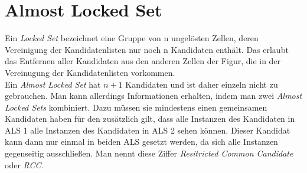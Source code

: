 \newpage
\section{Almost Locked Set}
Ein \textit{Locked Set} bezeichnet eine Gruppe von n ungelösten Zellen, deren Vereinigung der Kandidatenlisten nur noch n Kandidaten enthält. Das erlaubt das Entfernen aller Kandidaten aus den anderen Zellen der Figur, die in der Vereinugung der Kandidatenlisten vorkommen.\\
Ein \textit{Almost Locked Set} hat $n+1$ Kandidaten und ist daher einzeln nicht zu gebrauchen. Man kann allerdings Informationen erhalten, indem man zwei \textit{Almost Locked Sets} kombiniert. Dazu müssen sie mindestens einen gemeinsamen Kandidaten haben für den zusätzlich gilt, dass alle Instanzen des Kandidaten in ALS 1 alle Instanzen des Kandidaten in ALS 2 sehen können. Dieser Kandidat kann dann nur einmal in beiden ALS gesetzt werden, da sich alle Instanzen gegenseitig ausschließen. Man nennt diese Ziffer \textit{Resitricted Common Candidate} oder \textit{RCC}.